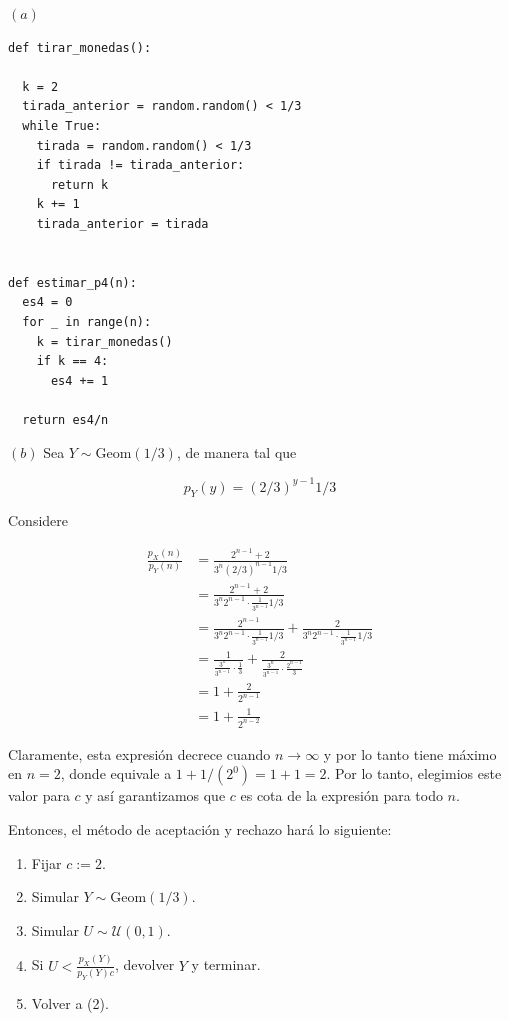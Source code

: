 \documentclass[a4paper, 12pt]{article}
\begin{document}
$(a)$

\begin{verbatim}
def tirar_monedas():

  k = 2
  tirada_anterior = random.random() < 1/3
  while True:
    tirada = random.random() < 1/3
    if tirada != tirada_anterior:
      return k
    k += 1
    tirada_anterior = tirada


def estimar_p4(n):
  es4 = 0 
  for _ in range(n):
    k = tirar_monedas()
    if k == 4:
      es4 += 1

  return es4/n
\end{verbatim}

$(b)$ Sea $Y \sim \text{Geom}(1/3)$, de manera tal que 

\begin{equation*}
  p_Y(y) = \left( 2 / 3 \right)^{y-1}1 /3
\end{equation*}

Considere 

\begin{align*}
  \frac{p_X(n)}{p_Y(n)} 
  &= \frac{2^{n-1}+2}{3^n (2 / 3)^{n-1}1 / 3} \\ 
  &= \frac{2^{n-1}+2}{3^n 2^{n-1} \cdot \frac{1}{3^{n-1}}1 / 3}  \\ 
  &= \frac{2^{n-1}}{3^n 2^{n-1} \cdot \frac{1}{3^{n-1}}1 / 3}  + \frac{2}{3^n 2^{n-1} \cdot \frac{1}{3^{n-1}}1 / 3}\\ 
  &= \frac{1}{\frac{3^n}{3^{n-1}}\cdot \frac{1}{3}} +
  \frac{2}{\frac{3^n}{3^{n-1}}\cdot \frac{2^{n-1}}{3}} \\ 
  &= 1 + \frac{2}{2^{n-1}} \\ 
  &= 1 + \frac{1}{2^{n-2}}
\end{align*}

Claramente, esta expresión decrece cuando $n \to \infty$ y por lo tanto tiene
máximo en $n = 2$, donde equivale a $1 + 1 / (2^0) = 1 + 1 = 2$. Por lo tanto,
elegimios este valor para $c$ y así garantizamos que $c$ es cota de la expresión
para todo $n$.

Entonces, el método de aceptación y rechazo hará lo siguiente: 

\begin{enumerate}
  \item Fijar $c := 2$. 
  \item Simular $Y \sim \text{Geom}(1 / 3)$. 
  \item Simular $U \sim \mathcal{U}(0, 1)$.
  \item Si $U < \frac{p_X(Y)}{p_Y(Y)c}$, devolver $Y$ y terminar. 
  \item Volver a (2).
\end{enumerate}
\end{document}
